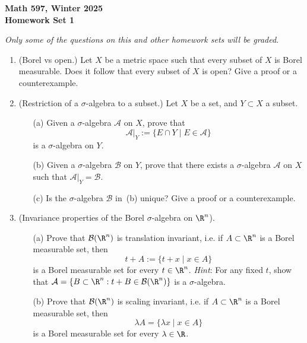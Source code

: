 \documentclass[11pt]{article}
\newcommand{\cA}{\mathcal{A}}
\newcommand{\cB}{\mathcal{B}}
\begin{document}
\thispagestyle{empty}




\begin{center}
\textbf{%
Math 597, Winter 2025\\
Homework Set 1\\
}
\end{center}
\begin{center}
\textit{Only some of the questions on this and other homework sets will be graded}.
\end{center}

\begin{enumerate}
\item (Borel vs open.)
  Let $X$ be a metric space such that every subset of $X$ is Borel measurable. Does it follow that every subset of $X$ is open? Give a proof or a counterexample.

\item (Restriction of a $\sigma$-algebra to a subset.)
  Let $X$ be a set, and $Y\subset X$ a subset.
  \begin{itemize}
  \item[(a)]
    Given a $\sigma$-algebra $\cA$ on $X$, prove that 
    \begin{equation*}
      \cA|_{Y}:=\{ E \cap Y\mid E\in \cA\} 
    \end{equation*}
    is a $\sigma$-algebra on $Y$. 
  \item[(b)]
    Given a $\sigma$-algebra $\cB$ on $Y$, prove that there exists a $\sigma$-algebra $\cA$ on $X$ such that $\cA|_Y=\cB$.
  \item[(c)]
    Is the $\sigma$-algebra $\cB$ in~(b) unique? Give a proof or a counterexample.
   \end{itemize}

\item (Invariance properties of the Borel $\sigma$-algebra on $\R^n$).
  \begin{itemize}
    \item[(a)]
      Prove that $\cB(\R^n)$ is translation invariant, i.e. if $A\subset\R^n$ is a Borel measurable set, then
      \[t+A:=\{t+x\mid x\in A\}\]
      is a Borel measurable set for every $t\in \R^n$. 
      \textit{Hint}: For any fixed $t$, show that $\cA=\{B\subset \R^n: t+B\in \cB(\R^n)\}$ is a $\sigma$-algebra.
    \item[(b)]
      Prove that $\cB(\R^n)$ is scaling invariant, i.e. if $A\subset\R^n$ is a Borel measurable set, then \[\lambda A=\{\lambda x\mid x\in A\}\] is a Borel measurable set for every $\lambda\in\R$. 
    \end{itemize}
    

\end{enumerate}
\end{document}

